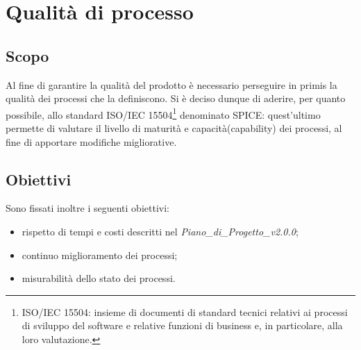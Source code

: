 \section{Qualità di processo}
\subsection{Scopo}
Al fine di garantire la qualità del prodotto è necessario perseguire in primis la qualità dei processi che la definiscono. Si è deciso dunque di aderire, per quanto possibile, allo standard ISO/IEC 15504\footnote{ISO/IEC 15504: insieme di documenti di standard tecnici relativi ai processi di sviluppo del software e relative funzioni di business e, in particolare, alla loro valutazione.} denominato SPICE\glo: quest'ultimo permette di valutare il livello di maturità e capacità\glo (capability) dei processi, al fine di apportare modifiche migliorative. 
\begin{comment}
Eliminato la subsection PDCA
\end{comment}
\subsection{Obiettivi}
Sono fissati inoltre i seguenti obiettivi: \begin{itemize}
\item rispetto di tempi e costi descritti nel \textit{Piano\_di\_Progetto\_v2.0.0};
\item continuo miglioramento dei processi;
\item misurabilità dello stato dei processi.
\end{itemize}
